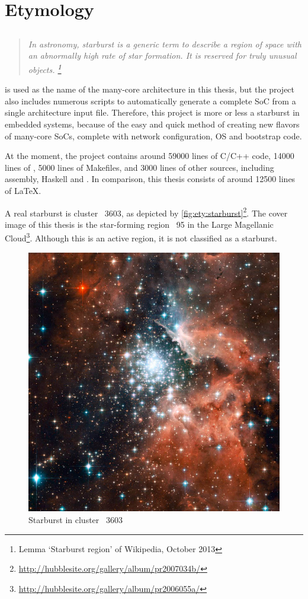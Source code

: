 \chapter{Etymology}
\label{a:etymology}

\section{\Starburst}

\begin{quote}\itshape%
	In astronomy, \emph{starburst} is a generic term to describe a region of space with an abnormally high rate of star formation.
	It is reserved for truly unusual objects.%
	\footnote{Lemma `Starburst region' of Wikipedia, October 2013}
\end{quote}


\Starburst* is used as the name of the many-core architecture in this thesis, but the project also includes numerous scripts to automatically generate a complete \ac{SoC} from a single architecture input file.
Therefore, this project is more or less a starburst in embedded systems, because of the easy and quick method of creating new flavors of many-core \acp{SoC}, complete with network configuration, \ac{OS} and bootstrap code.

At the moment, the project contains around \num{59000} lines of C/C++ code, \num{14000} lines of , \num{5000} lines of Makefiles, and \num{3000} lines of other sources, including assembly, Haskell and .
In comparison, this thesis consists of around \num{12500} lines of \LaTeX.

A real starburst is cluster ~3603, as depicted by \vref{fig:ety:starburst}\footnote{\url{http://hubblesite.org/gallery/album/pr2007034b/}}.
The cover image of this thesis is the star-forming region ~95 in the Large Magellanic Cloud\footnote{\url{http://hubblesite.org/gallery/album/pr2006055a/}}.
Although this is an active region, it is not classified as a starburst.

\begin{figure}%
\includegraphics[width=.7\linewidth]{figures/ety_starburst}%
\caption{Starburst in cluster ~3603}%
\label{fig:ety:starburst}%
\end{figure}



